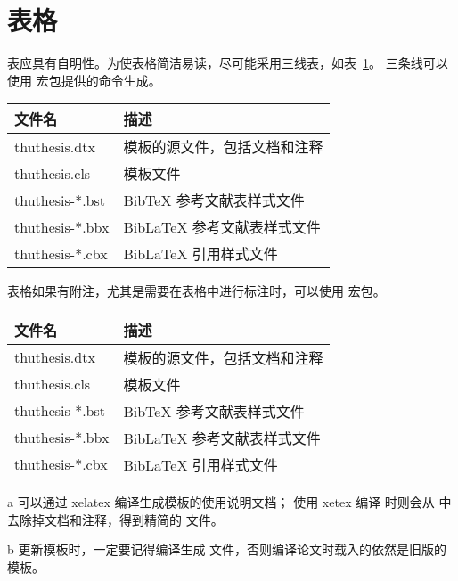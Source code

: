 \section{表格}

表应具有自明性。为使表格简洁易读，尽可能采用三线表，如表~\ref{tab:three-line}。
三条线可以使用  宏包提供的命令生成。

\begin{table}[!htb]
  \centering
  \begin{tabular}{ll}
    \toprule
    文件名          & 描述                         \\
    \midrule
    thuthesis.dtx   & 模板的源文件，包括文档和注释 \\
    thuthesis.cls   & 模板文件                     \\
    thuthesis-*.bst & BibTeX 参考文献表样式文件    \\
    thuthesis-*.bbx & BibLaTeX 参考文献表样式文件  \\
    thuthesis-*.cbx & BibLaTeX 引用样式文件        \\
    \bottomrule
  \end{tabular}
  \label{tab:three-line}
\end{table}

表格如果有附注，尤其是需要在表格中进行标注时，可以使用  宏包。

\begin{table}[!htb]
  \centering
  \begin{threeparttable}[c]
    \label{tab:three-part-table}
    \begin{tabular}{ll}
      \toprule
      文件名                 & 描述                         \\
      \midrule
      thuthesis.dtx\tnote{a} & 模板的源文件，包括文档和注释 \\
      thuthesis.cls\tnote{b} & 模板文件                     \\
      thuthesis-*.bst        & BibTeX 参考文献表样式文件    \\
      thuthesis-*.bbx        & BibLaTeX 参考文献表样式文件  \\
      thuthesis-*.cbx        & BibLaTeX 引用样式文件        \\
      \bottomrule
    \end{tabular}
    \begin{tablenotes}
      \item [a] 可以通过 xelatex 编译生成模板的使用说明文档；
        使用 xetex 编译  时则会从  中去除掉文档和注释，得到精简的  文件。
      \item [b] 更新模板时，一定要记得编译生成  文件，否则编译论文时载入的依然是旧版的模板。
    \end{tablenotes}
  \end{threeparttable}
\end{table}

